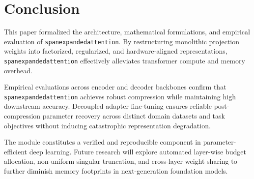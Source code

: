 \section{Conclusion}
This paper formalized the architecture, mathematical formulations, and empirical evaluation of \texttt{spanexpandedattention}. By restructuring monolithic projection weights into factorized, regularized, and hardware-aligned representations, \texttt{spanexpandedattention} effectively alleviates transformer compute and memory overhead.

Empirical evaluations across encoder and decoder backbones confirm that \texttt{spanexpandedattention} achieves robust compression while maintaining high downstream accuracy. Decoupled adapter fine-tuning ensures reliable post-compression parameter recovery across distinct domain datasets and task objectives without inducing catastrophic representation degradation.

The module constitutes a verified and reproducible component in parameter-efficient deep learning. Future research will explore automated layer-wise budget allocation, non-uniform singular truncation, and cross-layer weight sharing to further diminish memory footprints in next-generation foundation models.
